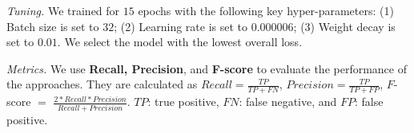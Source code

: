

{\em Tuning.} We trained {\tool} for $15$ epochs with the following key hyper-parameters: (1) Batch size is set to $32$; (2) Learning rate is set to $0.000006$; (3) Weight decay is set to $0.01$. We select the model with the lowest overall loss. 


{\em Metrics.} We use \textbf{Recall, Precision}, and {\bf F-score} to
evaluate the performance of the approaches. They are calculated as
$Recall = \frac{TP}{TP+FN}$, $Precision = \frac{TP}{TP+FP}$, $F$-score
$=$ $\frac{2*Recall*Precision}{Recall+Precision}$. $TP$: true
positive, $FN$: false negative, and $FP$: false positive.
